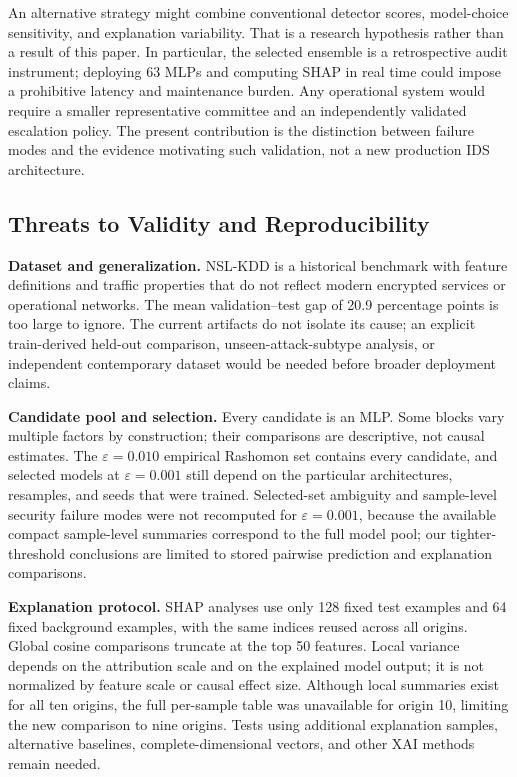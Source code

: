 \documentclass[10pt,conference]{IEEEtran}
\newcommand{\eps}{\varepsilon}
\begin{document}
An alternative strategy might combine conventional detector scores, model-choice sensitivity, and explanation variability. That is a research hypothesis rather than a result of this paper. In particular, the selected ensemble is a retrospective audit instrument; deploying 63 MLPs and computing SHAP in real time could impose a prohibitive latency and maintenance burden. Any operational system would require a smaller representative committee and an independently validated escalation policy. The present contribution is the distinction between failure modes and the evidence motivating such validation, not a new production IDS architecture.

\subsection{Threats to Validity and Reproducibility}
\textbf{Dataset and generalization.} NSL-KDD is a historical benchmark with feature definitions and traffic properties that do not reflect modern encrypted services or operational networks. The mean validation--test gap of 20.9 percentage points is too large to ignore. The current artifacts do not isolate its cause; an explicit train-derived held-out comparison, unseen-attack-subtype analysis, or independent contemporary dataset would be needed before broader deployment claims.

\textbf{Candidate pool and selection.} Every candidate is an MLP. Some blocks vary multiple factors by construction; their comparisons are descriptive, not causal estimates. The $\eps=0.010$ empirical Rashomon set contains every candidate, and selected models at $\eps=0.001$ still depend on the particular architectures, resamples, and seeds that were trained. Selected-set ambiguity and sample-level security failure modes were not recomputed for $\eps=0.001$, because the available compact sample-level summaries correspond to the full model pool; our tighter-threshold conclusions are limited to stored pairwise prediction and explanation comparisons.

\textbf{Explanation protocol.} SHAP analyses use only 128 fixed test examples and 64 fixed background examples, with the same indices reused across all origins. Global cosine comparisons truncate at the top 50 features. Local variance depends on the attribution scale and on the explained model output; it is not normalized by feature scale or causal effect size. Although local summaries exist for all ten origins, the full per-sample table was unavailable for origin 10, limiting the new comparison to nine origins. Tests using additional explanation samples, alternative baselines, complete-dimensional vectors, and other XAI methods remain needed.
\end{document}
